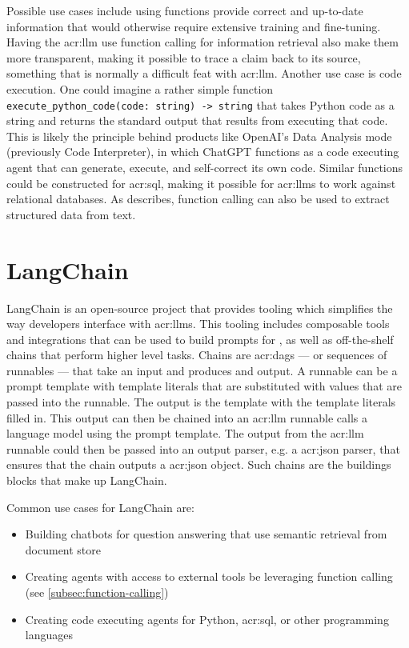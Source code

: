 Possible use cases include using functions provide correct and up-to-date information that would otherwise require extensive training and fine-tuning. Having the \gls{acr:llm} use function calling for information retrieval also make them more transparent, making it possible to trace a claim back to its source, something that is normally a difficult feat with \gls{acr:llm}. Another use case is code execution. One could imagine a rather simple function \texttt{execute\_python\_code(code: string) -> string} that takes Python code as a string and returns the standard output that results from executing that code. This is likely the principle behind products like OpenAI's Data Analysis mode (previously Code Interpreter), in which ChatGPT functions as a code executing agent that can generate, execute, and self-correct its own code. Similar functions could be constructed for \acrshort{acr:sql}, making it possible for \glspl{acr:llm} to work against relational databases. As \cite{eletiFunctionCallingOther2023} describes, function calling can also be used to extract structured data from text.


\section{LangChain}
\label{sec:langchain}

LangChain \citep{langchainaiLangchainaiLangchain2022} is an open-source project that provides tooling which simplifies the way developers interface with \glspl{acr:llm}. This tooling includes composable tools and integrations that can be used to build prompts for , as well as off-the-shelf chains that perform higher level tasks. Chains are \glspl{acr:dag} --- or sequences of runnables --- that take an input and produces and output. A runnable can be a prompt template with template literals that are substituted with values that are passed into the runnable. The output is the template with the template literals filled in. This output can then be chained into an \acrshort{acr:llm} runnable calls a language model using the prompt template. The output from the \acrshort{acr:llm} runnable could then be passed into an output parser, e.g. a \acrshort{acr:json} parser, that ensures that the chain outputs a \acrshort{acr:json} object. Such chains are the buildings blocks that make up LangChain.

Common use cases for LangChain are:

\begin{itemize}
    \item Building chatbots for question answering that use semantic retrieval from document store
    \item Creating agents with access to external tools be leveraging function calling (see \autoref{subsec:function-calling})
    \item Creating code executing agents for Python, \acrshort{acr:sql}, or other programming languages
\end{itemize}

